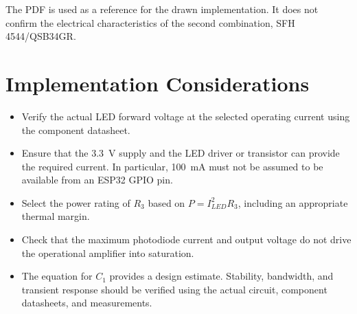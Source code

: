 \documentclass[12pt,a4paper]{article}
\begin{document}
The PDF is used as a reference for the drawn implementation. It does not
confirm the electrical characteristics of the second combination,
SFH 4544/QSB34GR.

\section{Implementation Considerations}
\begin{itemize}
  \item Verify the actual LED forward voltage at the selected operating
        current using the component datasheet.
  \item Ensure that the \SI{3.3}{\volt} supply and the LED driver or
        transistor can provide the required current. In particular,
        \SI{100}{\milli\ampere} must not be assumed to be available from
        an ESP32 GPIO pin.
  \item Select the power rating of $R_3$ based on
        $P=I_{LED}^{2}R_3$, including an appropriate thermal margin.
  \item Check that the maximum photodiode current and output voltage do
        not drive the operational amplifier into saturation.
  \item The equation for $C_1$ provides a design estimate. Stability,
        bandwidth, and transient response should be verified using the
        actual circuit, component datasheets, and measurements.
\end{itemize}
\end{document}
